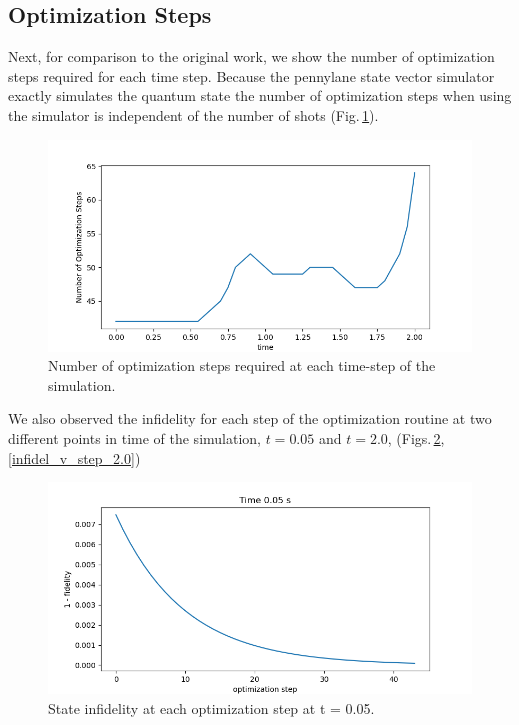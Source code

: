 \documentclass{article}
\begin{document}
\subsection{Optimization Steps}

Next, for comparison to the original work, we show the number of optimization steps required for each time step. Because the pennylane state vector simulator exactly simulates the quantum state the number of optimization steps when using the simulator is independent of the number of shots (Fig.\,\ref{opt_v_time}).

\begin{figure}[!htb]
    \centering
        \includegraphics[width=5in]{optimization_steps_v_time_default.qubit.png}
        \caption{Number of optimization steps required at each time-step of the simulation.}
        \label{opt_v_time}
\end{figure}

We also observed the infidelity for each step of the optimization routine at two different points in time of the simulation, $t = 0.05$ and $t = 2.0$, (Figs.\,\ref{infidel_v_step_0.05}, \ref{infidel_v_step_2.0})

\begin{figure}[!htb]
    \centering
        \includegraphics[width=5in]{cost_function_v_step_t0.05.png}
        \caption{State infidelity at each optimization step at t = 0.05.}
        \label{infidel_v_step_0.05}
\end{figure}
\end{document}
